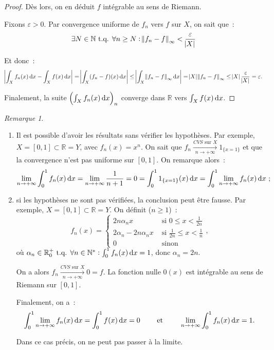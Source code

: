 \documentclass{report}
\theoremstyle{definition}
\theoremstyle{remark}
\newtheorem*{rmq}{Remarque}
\numberwithin{equation}{section}
\newcommand{\R}{\mathbb R}
\newcommand{\N}{\mathbb N}
\newcommand{\tq}{\text{ t.q. }}
\newcommand{\CONV}[5]{\xrightarrow[#2 \to #3]{#4 \text{ #5 } #1}}
\newcommand{\CVS}[3]{\CONV{#1}{#2}{#3}{CVS}{sur}}
\newcommand{\pinfty}{{+\infty}}
\begin{document}
\begin{proof}
			Dès lors, on en déduit $f$ intégrable au sens de Riemann.

			Fixons $\varepsilon > 0$. Par convergence uniforme de $f_n$ vers $f$ sur $X$, on sait que~:
			\begin{equation}
				\exists N \in \N \tq \forall n \geq N : \norm {f_n - f}_\infty < \frac \varepsilon{\abs X}
			\end{equation}

			Et donc~:
			\begin{equation}
				\abs {\int_X f_n(x)\dif x - \int_X f(x)\dif x} = \abs {\int_X (f_n-f)(x)\dif x} \leq \abs {\int_X\norm {f_n-f}_\infty\dif x}
				= \abs X\norm{f_n-f}_\infty \leq \abs X\frac \varepsilon{\abs X} = \varepsilon.
			\end{equation}

			Finalement, la suite $\left(\int_X f_n(x)\dif x\right)_n$ converge dans $\R$ vers $\int_X f(x)\dif x$.
			\end{proof}

			\begin{rmq}~
			\begin{enumerate}
				\item Il est possible d'avoir les résultats sans vérifier les hypothèses. Par exemple, $X = [0, 1] \subset \R = Y$, avec $f_n(x) = x^n$.
					On sait que $f_n \CVS Xn\pinfty 1_{\{x=1\}}$ et que la convergence n'est pas uniforme sur $[0, 1]$. On remarque alors~:
					\begin{equation}
						\lim_{n\to\pinfty}\int_0^1f_n(x)\dif x = \lim_{n\to\pinfty}\frac 1{n+1} = 0 = \int_0^11_{\{x=1\}}(x)\dif x
					  	= \int_0^1\lim_{n\to\pinfty}f_n(x)\dif x~;
					\end{equation}
				\item si les hypothèses ne sont pas vérifiées, la conclusion peut être fausse. Par exemple, $X = [0, 1] \subset \R = Y$. On définit ($n \geq 1$)~:
					\begin{equation}
						f_n(x) = \begin{cases}
					  	2n\alpha_nx &\text{ si } 0 \leq x < \frac 1{2n} \\
						2\alpha_n - 2n\alpha_nx &\text{ si }\frac 1{2n} \leq x < \frac 1n \\
						0 &\text{ sinon}\end{cases},
					\end{equation}
					  où $\alpha_n \in \R^+_0 \tq \forall n \in \N^* : \int_0^1f_n(x)\dif x = 1$, donc $\alpha_n = 2n$.

					  On a alors $f_n \CVS Xn\pinfty 0 = f$. La fonction nulle $0(x)$ est intégrable au sens de Riemann sur $[0, 1]$.

					  Finalement, on a~:
					\begin{equation}
						\int_0^1\lim_{n \to \pinfty}f_n(x)\dif x = \int_0^1f(x)\dif x = 0 \qquad \text{ et } \qquad \lim_{n \to \pinfty}\int_0^1f_n(x)\dif x = 1.
					\end{equation}

					  Dans ce cas précis, on ne peut pas passer à la limite.
			\end{enumerate}
			\end{rmq}
\end{document}
